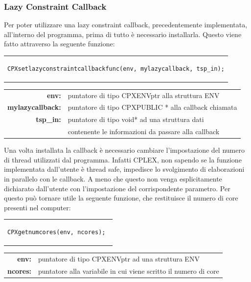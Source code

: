 \subsubsection{Lazy Constraint Callback}
Per poter utilizzare una lazy constraint callback, precedentemente implementata, all'interno del programma, prima di tutto è necessario installarla. Questo viene fatto attraverso la seguente funzione:
\begin{center}
\begin{tabular}{c}
\begin{lstlisting}[linewidth=380pt, basicstyle=\footnotesize\sffamily,]     
CPXsetlazyconstraintcallbackfunc(env, mylazycallback, tsp_in);
\end{lstlisting}
\end{tabular}
\end{center}
\begin{table}[h]
\centering
\begin{tabular}{rl}
\textbf{env:} & {puntatore di tipo CPXENVptr alla struttura ENV}\\
\textbf{mylazycallback:} & {puntatore di tipo CPXPUBLIC * alla callback chiamata}\\
\textbf{tsp\_in:} & {puntatore di tipo void* ad una struttura dati }\\
& {contenente le informazioni da passare alla callback}\\
\end{tabular}
\end{table}
Una volta installata la callback è necessario cambiare l'impostazione del numero di thread utilizzati dal programma. Infatti CPLEX, non sapendo se la funzione implementata dall'utente è thread safe, impedisce lo svolgimento di elaborazioni in parallelo con le callback. A meno che questo non venga esplicitamente dichiarato dall'utente con l'impostazione del corrispondente parametro.
Per questo può tornare utile la seguente funzione, che restituisce il numero di core presenti nel computer:\\
\begin{center}
\begin{tabular}{c}
\begin{lstlisting}[linewidth=170pt, basicstyle=\footnotesize\sffamily,]
CPXgetnumcores(env, ncores); 
\end{lstlisting}
\end{tabular}
\end{center}
\vspace{2cm}
\begin{table}[h]
\centering
\begin{tabular}{rl}
\textbf{env:} & {puntatore di tipo CPXENVptr ad una struttura ENV}\\
\textbf{ncores:} & {puntatore alla variabile in cui viene scritto il numero di core}\\            
\end{tabular}
\end{table} 
